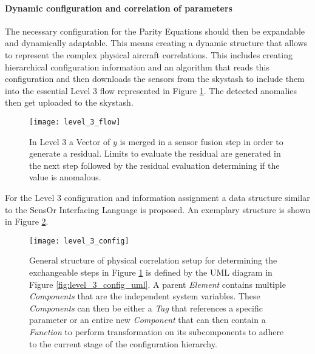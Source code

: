 \paragraph{Dynamic configuration and correlation of parameters}

The necessary configuration for the Parity Equations should then be expandable and dynamically adaptable. This means creating a dynamic structure that allows to represent the complex physical aircraft correlations. This includes creating hierarchical configuration information and an algorithm that reads this configuration and then downloads the sensors from the skystash to include them into the essential Level 3 flow represented in Figure \ref{fig:level_3_flow}. The detected anomalies then get uploaded to the skystash.

\begin{figure}
    \centering
    \texttt{[image: level\_3\_flow]}
    \caption[Level 3 flowchart for residual evaluation]{In Level 3 a Vector of $y$ is merged in a sensor fusion step in order to generate a residual. Limits to evaluate the residual are generated in the next step followed by the residual evaluation determining if the value is anomalous.}
    \label{fig:level_3_flow}
\end{figure}

For the Level 3 configuration and information assignment a data structure similar to the SensOr Interfacing Language is proposed. An exemplary structure is shown in Figure \ref{fig:level_3_config}.
\begin{figure}
    \centering
    \texttt{[image: level\_3\_config]}
    \caption[Level 3 hierarchical Configuration Structure]{General structure of physical correlation setup for determining the exchangeable steps in Figure \ref{fig:level_3_flow} is defined by the UML diagram in Figure \ref{fig:level_3_config_uml}. A parent \textit{Element} contains multiple \textit{Components} that are the independent system variables. These \textit{Components} can then be either a \textit{Tag} that references a specific parameter or an entire new \textit{Component} that can then contain a \textit{Function} to perform transformation on its subcomponents to adhere to the current stage of the configuration hierarchy.}
    \label{fig:level_3_config}
\end{figure}

